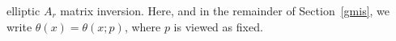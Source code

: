 elliptic $A_r$ matrix inversion. Here, and in the remainder of Section~\ref{gmis}, we write
 $\theta(x)=\theta(x;p)$, where $p$ is viewed as fixed.
